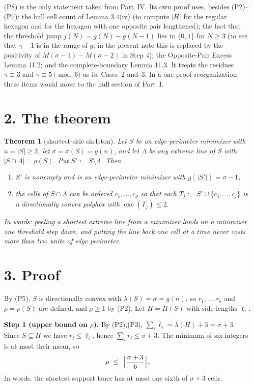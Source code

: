 \documentclass[11pt]{article}
\theoremstyle{plain}
\newtheorem{theorem}{Theorem}
\theoremstyle{remark}
\newcommand{\sm}{\setminus}
\DeclareMathOperator{\exc}{exc}
\begin{document}
(P8) is the only statement taken from Part~IV. Its own proof uses, besides (P2)--(P7): the
hull cell count of Lemma 3.4(iv) (to compute \(|H|\) for the regular hexagon and for the
hexagon with one opposite pair lengthened); the fact that the threshold jump
\(j(N)=g(N)-g(N-1)\) lies in \(\{0,1\}\) for \(N\ge3\) (to see that \(\gamma-1\) is in the
range of \(g\); in the present note this is replaced by the positivity of
\(M(\sigma-1)-M(\sigma-2)\) in Step 4); the Opposite-Pair Excess Lemma 11.2; and the
complete-boundary Lemma 11.3. It treats the residues \(\gamma\equiv3\) and
\(\gamma\equiv5\pmod 6\) as its Cases~2 and~3. In a one-proof reorganization these items
would move to the hull section of Part~I.

\section*{2. The theorem}

\begin{theorem}[shortest-side skeleton]\label{thm:skel}
Let \(S\) be an edge-perimeter minimizer with \(n=|S|\ge3\), let \(\sigma=\sigma(S)=g(n)\),
and let \(\Lambda\) be \emph{any} extreme line of \(S\) with \(|S\cap\Lambda|=\rho(S)\). Put
\(S':=S\sm\Lambda\). Then
\begin{enumerate}
\item[(i)] \(S'\) is nonempty and is an edge-perimeter minimizer with \(g(|S'|)=\sigma-1\);
\item[(ii)] the cells of \(S\cap\Lambda\) can be ordered \(c_{1},\dots,c_{\rho}\) so that each
\(T_{j}:=S'\cup\{c_{1},\dots,c_{j}\}\) is a directionally convex polyhex with
\(\exc(T_{j})\le2\).
\end{enumerate}
In words: peeling a shortest extreme line from a minimizer lands on a minimizer one
threshold step down, and putting the line back one cell at a time never costs more than
two units of edge perimeter.
\end{theorem}

\section*{3. Proof}

By (P5), \(S\) is directionally convex with \(\lambda(S)=\sigma=g(n)\), so
\(r_{1},\dots,r_{6}\) and \(\rho=\rho(S)\) are defined, and \(\rho\ge1\) by (P2). Let
\(H=H(S)\) with side lengths \(\ell_{i}\).

\medskip\noindent\textbf{Step 1 (upper bound on \(\rho\)).}
By (P2),(P3), \(\sum_{i}\ell_{i}=\lambda(H)+3=\sigma+3\). Since \(S\subseteq H\) we have
\(r_{i}\le\ell_{i}\), hence \(\sum_{i}r_{i}\le\sigma+3\). The minimum of six integers is at
most their mean, so
\begin{equation}\label{eq:rhobound}
   \rho\ \le\ \Bigl\lfloor\frac{\sigma+3}{6}\Bigr\rfloor .
\end{equation}
In words: the shortest support trace has at most one sixth of \(\sigma+3\) cells.
\end{document}
